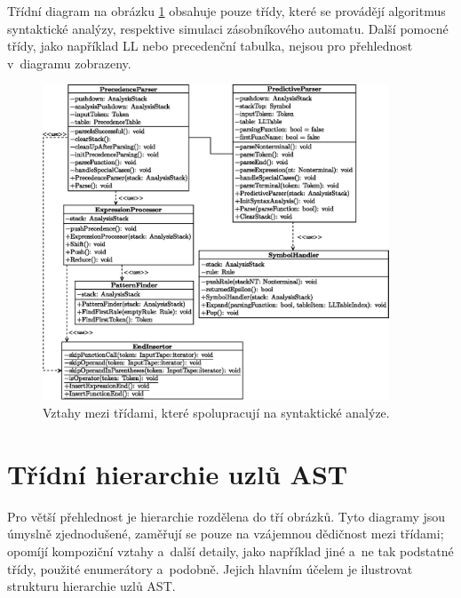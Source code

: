 Třídní diagram na obrázku \ref{fig_parsers_class_diagram} obsahuje pouze třídy, které se provádějí algoritmus syntaktické analýzy, respektive simulaci zásobníkového automatu.
Další pomocné třídy, jako například LL nebo precedenční tabulka, nejsou pro přehlednost v~diagramu zobrazeny.
\begin{figure}[ht]
    \centering
    \includegraphics[width=0.92\textwidth]{obrazky-figures/parsers_class_diagram.eps}
    \caption{Vztahy mezi třídami, které spolupracují na syntaktické analýze.}
    \label{fig_parsers_class_diagram}
\end{figure}

\chapter{Třídní hierarchie uzlů AST} \label{kap_priloha_c}
Pro větší přehlednost je hierarchie rozdělena do tří obrázků.
Tyto diagramy jsou úmyslně zjednodušené, zaměřují se pouze na vzájemnou dědičnost mezi třídami; opomíjí kompoziční vztahy a~další detaily, jako například jiné a~ne tak podstatné třídy, použité enumerátory a~podobně.
Jejich hlavním účelem je ilustrovat strukturu hierarchie uzlů AST.

